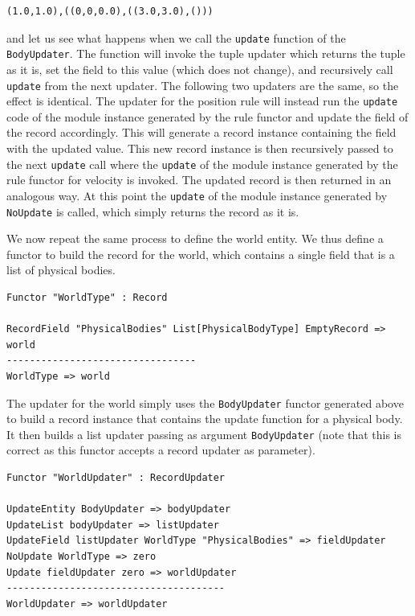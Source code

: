 \begin{lstlisting}
(1.0,1.0),((0,0,0.0),((3.0,3.0),()))
\end{lstlisting}

\noindent
and let us see what happens when we call the \texttt{update} function of the \texttt{BodyUpdater}. The function will invoke the tuple updater which returns the tuple as it is, set the field to this value (which does not change), and recursively call \texttt{update} from the next updater. The following two updaters are the same, so the effect is identical. The updater for the position rule will instead run the \texttt{update} code of the module instance generated by the rule functor and update the field of the record accordingly. This will generate a record instance containing the field with the updated value. This new record instance is then recursively passed to the next \texttt{update} call where the \texttt{update} of the module instance generated by the rule functor for velocity is invoked. The updated record is then returned in an analogous way. At this point the \texttt{update} of the module instance generated by \texttt{NoUpdate} is called, which simply returns the record as it is.

We now repeat the same process to define the world entity. We thus define a functor to build the record for the world, which contains a single field that is a list of physical bodies.

\begin{lstlisting}
Functor "WorldType" : Record

RecordField "PhysicalBodies" List[PhysicalBodyType] EmptyRecord => world
---------------------------------
WorldType => world
\end{lstlisting}

\noindent
The updater for the world simply uses the \texttt{BodyUpdater} functor generated above to build a record instance that contains the update function for a physical body. It then builds a list updater passing as argument \texttt{BodyUpdater} (note that this is correct as this functor accepts a record updater as parameter).

\begin{lstlisting}
Functor "WorldUpdater" : RecordUpdater

UpdateEntity BodyUpdater => bodyUpdater
UpdateList bodyUpdater => listUpdater
UpdateField listUpdater WorldType "PhysicalBodies" => fieldUpdater
NoUpdate WorldType => zero
Update fieldUpdater zero => worldUpdater
--------------------------------------
WorldUpdater => worldUpdater
\end{lstlisting}

